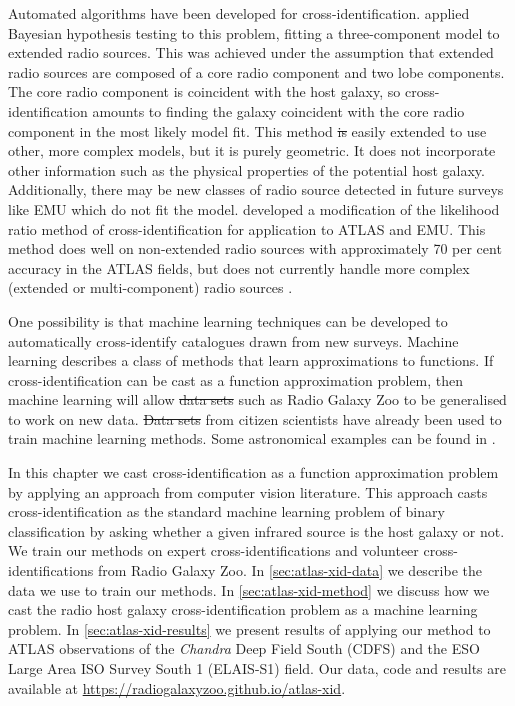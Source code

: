 \documentclass[11pt, a4paper]{book}
\providecommand{\DIFaddtex}[1]{{\protect\color{blue}\uwave{#1}}} %
\providecommand{\DIFdeltex}[1]{{\protect\color{red}\sout{#1}}}                      %
\providecommand{\DIFaddbegin}{} %
\providecommand{\DIFaddend}{} %
\providecommand{\DIFdelbegin}{} %
\providecommand{\DIFdelend}{} %
\providecommand{\DIFadd}[1]{\texorpdfstring{\DIFaddtex{#1}}{#1}} %
\providecommand{\DIFdel}[1]{\texorpdfstring{\DIFdeltex{#1}}{}} %
\newcommand{\DIFscaledelfig}{0.5}
\newlength{\DIFdelgraphicswidth} %
\newlength{\DIFdelgraphicsheight} %
\newcommand{\DIFaddincludegraphics}[2][]{{\color{blue}\fbox{\DIFOincludegraphics[#1]{#2}}}} %
\newcommand{\DIFdelincludegraphics}[2][]{%
\sbox{\DIFdelgraphicsbox}{\DIFOincludegraphics[#1]{#2}}%
\settoboxwidth{\DIFdelgraphicswidth}{\DIFdelgraphicsbox} %
\settoboxtotalheight{\DIFdelgraphicsheight}{\DIFdelgraphicsbox} %
\scalebox{\DIFscaledelfig}{%
\parbox[b]{\DIFdelgraphicswidth}{\usebox{\DIFdelgraphicsbox}\\[-\baselineskip] \rule{\DIFdelgraphicswidth}{0em}}\llap{\resizebox{\DIFdelgraphicswidth}{\DIFdelgraphicsheight}{%
\setlength{\unitlength}{\DIFdelgraphicswidth}%
\begin{picture}(1,1)%
\thicklines\linethickness{2pt} %
{\color[rgb]{1,0,0}\put(0,0){\framebox(1,1){}}}%
{\color[rgb]{1,0,0}\put(0,0){\line( 1,1){1}}}%
{\color[rgb]{1,0,0}\put(0,1){\line(1,-1){1}}}%
\end{picture}%
}\hspace*{3pt}}} %
} %
\DeclareRobustCommand{\DIFaddbegin}{\DIFOaddbegin \let\includegraphics\DIFaddincludegraphics} %
\DeclareRobustCommand{\DIFaddend}{\DIFOaddend \let\includegraphics\DIFOincludegraphics} %
\DeclareRobustCommand{\DIFdelbegin}{\DIFOdelbegin \let\includegraphics\DIFdelincludegraphics} %
\DeclareRobustCommand{\DIFdelend}{\DIFOaddend \let\includegraphics\DIFOincludegraphics} %
\begin{document}
    Automated algorithms have been developed for cross-identification.
    \citet{fan15} applied Bayesian
    hypothesis testing to this problem, fitting a three-component model to extended radio
    sources. This was achieved under the assumption that extended radio sources
    are composed of a core radio component and two lobe components. The core
    radio component is coincident with the host galaxy, so cross-identification
    amounts to finding the galaxy coincident with the core radio component in
    the most likely model fit. This method \DIFdelbegin \DIFdel{is }\DIFdelend \DIFaddbegin \DIFadd{could be }\DIFaddend easily extended to use other, more
    complex models, but it is purely geometric. It does not incorporate
    other information such as the physical properties of the potential host
    galaxy. Additionally, there may be new classes of radio source detected in
    future surveys like EMU which do not fit the model. \citet{weston18lrpy}
    developed a modification of the likelihood ratio method of
    cross-identification \citep{richter75likelihood} for application to ATLAS
    and EMU. This method does well on non-extended radio sources
    with approximately 70 per cent accuracy in the ATLAS fields, but does
    not currently handle more complex (extended or multi-component) radio sources
    \citep{norris17unexpected}.

    {One possibility is that machine learning techniques can
    be developed to automatically cross-identify catalogues drawn from new surveys}. Machine learning
    describes a class of methods that learn approximations to functions. {If
    cross-identification can be cast as a function approximation problem, then machine learning will allow \DIFdelbegin \DIFdel{data
    sets }\DIFdelend \DIFaddbegin \DIFadd{datasets
    }\DIFaddend such as Radio Galaxy Zoo to be generalised to work on new data. \DIFdelbegin \DIFdel{Data sets }\DIFdelend \DIFaddbegin \DIFadd{Datasets }\DIFaddend from
    citizen scientists have already been used to train machine learning methods.
    Some astronomical examples can be found in \citet{marshall15citizen}.}

    In this chapter we {cast cross-identification as a function
    approximation problem by} applying an approach from computer vision
    literature. This approach casts cross-identification as the standard machine
    learning problem of binary classification {by asking whether a given
    infrared source is the host galaxy or not}. We train our methods on expert
    cross-identifications and volunteer cross-identifications from Radio Galaxy Zoo. In
    \autoref{sec:atlas-xid-data} we describe the data we use to train our methods. In
    \autoref{sec:atlas-xid-method} we discuss how we cast the radio host galaxy
    cross-identification problem as a machine learning problem. In
    \autoref{sec:atlas-xid-results} we present results of applying our method to ATLAS
    observations of the \emph{Chandra} Deep Field South (CDFS) and the ESO Large Area ISO Survey South 1 (ELAIS-S1) field. Our data, code and results are
    available at \url{https://radiogalaxyzoo.github.io/atlas-xid}.
\end{document}
